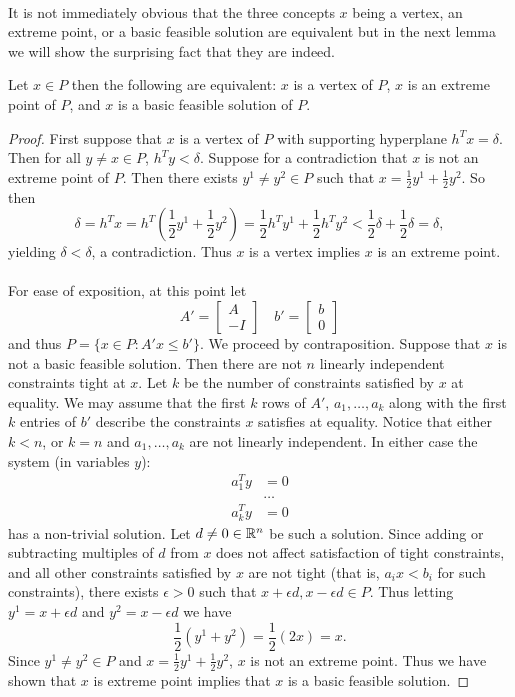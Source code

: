 \paragraph{} It is not immediately obvious that the three concepts $x$ being a vertex, an extreme point, or a basic feasible solution are equivalent but in the next lemma we will show the surprising fact that they are indeed.
\begin{lemma} Let $x \in P$ then the following are equivalent: $x$ is a vertex of $P$, $x$ is an extreme point of $P$, and $x$ is a basic feasible solution of $P$.
\end{lemma}
\begin{proof}
First suppose that $x$ is a vertex of $P$ with supporting hyperplane $h^T x = \delta$. Then for all $y \neq x \in P$, $h^Ty < \delta$. Suppose for a contradiction that $x$ is not an extreme point of $P$. Then there exists $y^1 \neq y^2 \in P$ such that $x = \frac{1}{2}y^1 + \frac{1}{2} y^2$. So then $$\delta = h^T x = h^T(\frac{1}{2} y^1 + \frac{1}{2} y^2) = \frac{1}{2}h^Ty^1 + \frac{1}{2} h^Ty^2 < \frac{1}{2}\delta + \frac{1}{2} \delta = \delta,$$ yielding $\delta < \delta$, a contradiction. Thus $x$ is a vertex implies $x$ is an extreme point.
\paragraph{}
For ease of exposition, at this point let $$A' = \begin{bmatrix} A \\ -I \end{bmatrix} \quad b' = \begin{bmatrix} b \\ 0 \end{bmatrix}$$ and thus $P = \{x\in P : A'x \leq b'\}$. We proceed by contraposition. Suppose that $x$ is not a basic feasible solution. Then there are not $n$ linearly independent constraints tight at $x$. Let $k$ be the number of constraints satisfied by $x$ at equality. We may assume that the first $k$ rows of $A'$, $a_1, \dots, a_k$ along with the first $k$ entries of $b'$ describe the constraints $x$ satisfies at equality. Notice that either $k<n$, or $k=n$ and $a_1, \dots, a_k$ are not linearly independent. In either case the system (in variables $y$):
\begin{align*}
a_1^T y &= 0 \\
&\dots \\
a_k^T y &= 0
\end{align*}
has a non-trivial solution. Let $d \neq 0 \in \mathbb{R}^n$ be such a solution. Since adding or subtracting multiples of $d$ from $x$ does not affect satisfaction of tight constraints, and all other constraints satisfied by $x$ are not tight (that is, $a_i x < b_i$ for such constraints), there exists $\epsilon > 0$ such that $x+ \epsilon d, x-\epsilon d \in P$. Thus letting $y^1 = x+ \epsilon d$ and $y^2 = x-\epsilon d$ we have
$$\frac{1}{2}(y^1 + y^2) = \frac{1}{2}(2x) = x.$$
Since $y^1 \neq y^2 \in P$ and $x = \frac{1}{2}y^1 + \frac{1}{2}y^2$, $x$ is not an extreme point. Thus we have shown that $x$ is extreme point implies that $x$ is a basic feasible solution.

\end{proof}
